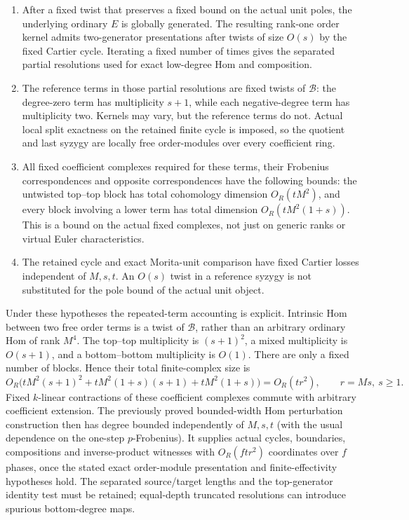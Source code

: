 \begin{enumerate}
\item After a fixed twist that preserves a fixed bound on the actual unit
      poles, the underlying ordinary $E$ is globally generated.  The
      resulting rank-one order kernel admits two-generator presentations
      after twists of size $O(s)$ by the fixed Cartier cycle.  Iterating a
      fixed number of times gives the separated partial resolutions used
      for exact low-degree Hom and composition.
\item The reference terms in those partial resolutions are fixed twists of
      $\mathcal B$: the degree-zero term has multiplicity $s+1$, while each
      negative-degree term has multiplicity two.  Kernels may vary, but the
      reference terms do not.  Actual local split exactness on the retained
      finite cycle is imposed, so the quotient and last syzygy are locally
      free order-modules over every coefficient ring.
\item All fixed coefficient complexes required for these terms, their
      Frobenius correspondences and opposite correspondences have the
      following bounds: the untwisted top--top block has total cohomology
      dimension $O_R(tM^2)$, and every block involving a lower term has
      total dimension $O_R(tM^2(1+s))$.  This is a bound on the actual fixed
      complexes, not just on generic ranks or virtual Euler characteristics.
\item The retained cycle and exact Morita-unit comparison have fixed
      Cartier losses independent of $M,s,t$.  An $O(s)$ twist in a reference
      syzygy is not substituted for the pole bound of the actual unit object.
\end{enumerate}

Under these hypotheses the repeated-term accounting is explicit.  Intrinsic
Hom between two free order terms is a twist of $\mathcal B$, rather than an
arbitrary ordinary Hom of rank $M^4$.  The top--top multiplicity is
$(s+1)^2$, a mixed multiplicity is $O(s+1)$, and a bottom--bottom
multiplicity is $O(1)$.  There are only a fixed number of blocks.  Hence
their total finite-complex size is
\[
 O_R\bigl(tM^2(s+1)^2
       +tM^2(1+s)(s+1)+tM^2(1+s)\bigr)
                         =O_R(tr^2),\qquad r=Ms,\ s\ge1.
\]
Fixed $k$-linear contractions of these coefficient complexes commute with
arbitrary coefficient extension.  The previously proved bounded-width
Hom perturbation construction then has degree bounded independently of
$M,s,t$ (with the usual dependence on the one-step $p$-Frobenius).
It supplies actual cycles, boundaries, compositions and inverse-product
witnesses with $O_R(ftr^2)$ coordinates over $f$ phases, once the stated
exact order-module presentation and finite-effectivity hypotheses hold.
The separated source/target lengths and the top-generator identity test
must be retained; equal-depth truncated resolutions can introduce spurious
bottom-degree maps.

